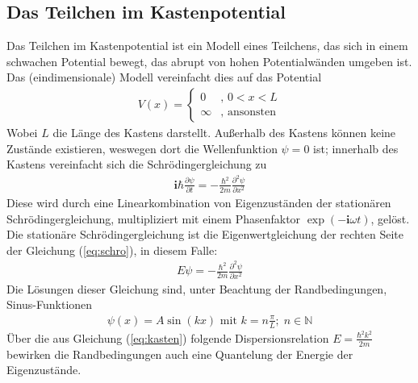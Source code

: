 \documentclass[numbers=noenddot,12pt,a4paper]{scrartcl}
\newcommand{\imag}{\mathbf{i}}
\begin{document}
\subsection{Das Teilchen im Kastenpotential}
Das Teilchen im Kastenpotential ist ein Modell eines Teilchens, das sich in einem schwachen Potential bewegt, das abrupt von hohen Potentialwänden umgeben ist. Das (eindimensionale) Modell vereinfacht dies auf das Potential
\begin{align}
V(x)=\left\{\begin{array}{ll}
0&,\,0< x< L \\ 
\infty &\text{, ansonsten}
\end{array} \right.
\end{align}
Wobei $L$ die Länge des Kastens darstellt. Außerhalb des Kastens können keine Zustände existieren, weswegen dort die Wellenfunktion $\psi=0$ ist; innerhalb des Kastens vereinfacht sich die Schrödingergleichung zu
\begin{align}
\imag\hbar\frac{\partial\psi}{\partial t}=-\frac{\hbar^2}{2m}\frac{\partial^2\psi}{\partial x^2}
\end{align}
Diese wird durch eine Linearkombination von Eigenzuständen der stationären Schrödingergleichung, multipliziert mit einem Phasenfaktor $\exp\left(-\imag\omega t\right)$, gelöst. Die stationäre Schrödingergleichung ist die Eigenwertgleichung der rechten Seite der Gleichung (\ref{eq:schro}), in diesem Falle:
\begin{align}
E\psi=-\frac{\hbar^2}{2m}\frac{\partial^2\psi}{\partial x^2}\label{eq:kasten}
\end{align}
Die Lösungen dieser Gleichung sind, unter Beachtung der Randbedingungen, Sinus-Funktionen
\begin{align}
\psi(x)=A\sin\left(kx\right)\text{ mit }k=n\frac{\pi}{L};\;n\in\mathbb{N}\label{eq:kastenl}
\end{align}
Über die aus Gleichung (\ref{eq:kasten}) folgende Dispersionsrelation $E=\frac{\hbar^2k^2}{2m}$ bewirken die Randbedingungen auch eine Quantelung der Energie der Eigenzustände.
\end{document}
